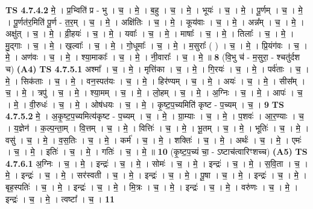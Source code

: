 \documentclass[17pt]{extarticle}
\begin{document}
                  \newline
                                \textbf{ TS 4.7.4.2} \newline
                  मे॒ । प्र॒भ्विति॑ प्र - भु । च॒ । मे॒ । ब॒हु । च॒ । मे॒ । भूयः॑ । च॒ । मे॒ । पू॒र्णम् । च॒ । मे॒ । पू॒र्णत॑र॒मिति॑ पू॒र्ण - त॒र॒म् । च॒ । मे॒ । अक्षि॑तिः । च॒ । मे॒ । कूय॑वाः । च॒ । मे॒ । अन्न᳚म् । च॒ । मे॒ । अक्षु॑त् । च॒ । मे॒ । व्री॒हयः॑ । च॒ । मे॒ । यवाः᳚ । च॒ । मे॒ । माषाः᳚ । च॒ । मे॒ । तिलाः᳚ । च॒ । मे॒ । मु॒द्गाः । च॒ । मे॒ । ख॒ल्वाः᳚ । च॒ । मे॒ । गो॒धूमाः᳚ । च॒ । मे॒ । म॒सुराः᳚ ( ) । च॒ । मे॒ । प्रि॒यंग॑वः । च॒ । मे॒ । अण॑वः । च॒ । मे॒ । श्या॒माकाः᳚ । च॒ । मे॒ । नी॒वाराः᳚ । च॒ । मे॒ ॥ \textbf{  8 } \newline
                  \newline
                      (वि॒भु च॑ - म॒सुरा॒ - श्चतु॑र्दश च)  \textbf{(A4)} \newline \newline
                                \textbf{ TS 4.7.5.1} \newline
                  अश्मा᳚ । च॒ । मे॒ । मृत्ति॑का । च॒ । मे॒ । गि॒रयः॑ । च॒ । मे॒ । पर्व॑ताः । च॒ । मे॒ । सिक॑ताः । च॒ । मे॒ । वन॒स्पत॑यः । च॒ । मे॒ । हिर॑ण्यम् । च॒ । मे॒ । अयः॑ । च॒ । मे॒ । सीस᳚म् । च॒ । मे॒ । त्रपु॑ । च॒ । मे॒ । श्या॒मम् । च॒ । मे॒ । लो॒हम् । च॒ । मे॒ । अ॒ग्निः । च॒ । मे॒ । आपः॑ । च॒ । मे॒ । वी॒रुधः॑ । च॒ । मे॒ । ओष॑धयः । च॒ । मे॒ । कृ॒ष्ट॒प॒च्यमिति॑ कृष्ट - प॒च्यम् । च॒ । \textbf{  9} \newline
                  \newline
                                \textbf{ TS 4.7.5.2} \newline
                  मे॒ । अ॒कृ॒ष्ट॒प॒च्यमित्य॑कृष्ट - प॒च्यम् । च॒ । मे॒ । ग्रा॒म्याः । च॒ । मे॒ । प॒शवः॑ । आ॒र॒ण्याः । च॒ । य॒ज्ञेन॑ । क॒ल्प॒न्ता॒म् । वि॒त्तम् । च॒ । मे॒ । वित्तिः॑ । च॒ । मे॒ । भू॒तम् । च॒ । मे॒ । भूतिः॑ । च॒ । मे॒ । वसु॑ । च॒ । मे॒ । व॒स॒तिः । च॒ । मे॒ । कर्म॑ । च॒ । मे॒ । शक्तिः॑ । च॒ । मे॒ । अर्थः॑ । च॒ । मे॒ । एमः॑ । च॒ । मे॒ । इतिः॑ । च॒ । मे॒ । गतिः॑ । च॒ । मे॒ ॥ \textbf{  10} \newline
                  \newline
                      (कृ॒ष्ट॒प॒च्यं चा॒ - ऽष्टाच॑त्वारिꣳशच्च)  \textbf{(A5)} \newline \newline
                                \textbf{ TS 4.7.6.1} \newline
                  अ॒ग्निः । च॒ । मे॒ । इन्द्रः॑ । च॒ । मे॒ । सोमः॑ । च॒ । मे॒ । इन्द्रः॑ । च॒ । मे॒ । स॒वि॒ता । च॒ । मे॒ । इन्द्रः॑ । च॒ । मे॒ । सर॑स्वती । च॒ । मे॒ । इन्द्रः॑ । च॒ । मे॒ । पू॒षा । च॒ । मे॒ । इन्द्रः॑ । च॒ । मे॒ । बृह॒स्पतिः॑ । च॒ । मे॒ । इन्द्रः॑ । च॒ । मे॒ । मि॒त्रः । च॒ । मे॒ । इन्द्रः॑ । च॒ । मे॒ । वरु॑णः । च॒ । मे॒ । इन्द्रः॑ । च॒ । मे॒ । त्वष्टा᳚ । च॒ । \textbf{  11} \newline
\end{document}
